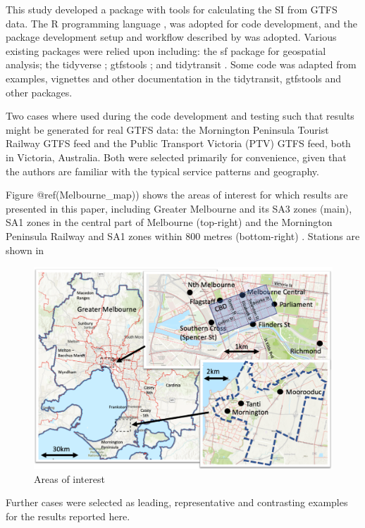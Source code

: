 \documentclass[preprint, 3p,
authoryear]{elsarticle} %
\begin{document}
This study developed a package with tools for calculating the SI from
GTFS data. The R programming language \citep{R-base}, was adopted for
code development, and the package development setup and workflow
described by \citet{wickham2023r} was adopted. Various existing packages
were relied upon including: the sf package \citep{R-sf} for geospatial
analysis; the tidyverse \citep{tidyverse2019}; gtfstools
\citep{R-gtfstools}; and tidytransit \citep{R-tidytransit}. Some code
was adapted from examples, vignettes and other documentation in the
tidytransit, gtfstools and other packages.

Two cases where used during the code development and testing such that
results might be generated for real GTFS data: the Mornington Peninsula
Tourist Railway GTFS feed and the Public Transport Victoria (PTV) GTFS
feed, both in Victoria, Australia. Both were selected primarily for
convenience, given that the authors are familiar with the typical
service patterns and geography.

Figure @ref(Melbourne\_map)) shows the areas of interest for which
results are presented in this paper, including Greater Melbourne and its
SA3 zones (main), SA1 zones in the central part of Melbourne (top-right)
and the Mornington Peninsula Railway and SA1 zones within 800 metres
(bottom-right) . Stations are shown in

\begin{figure}
\includegraphics[width=1\linewidth]{graphics/all_maps} \caption{Areas of interest}\label{fig:Melbourne_map}
\end{figure}

Further cases were selected as leading, representative and contrasting
examples for the results reported here.
\end{document}
